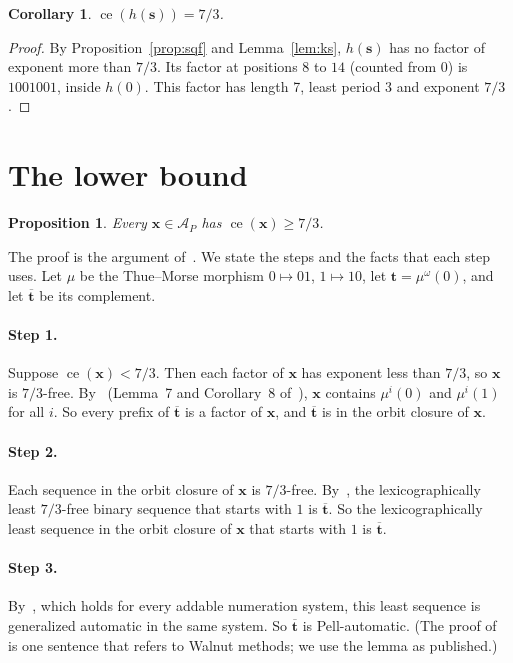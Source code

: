 \documentclass[11pt]{article}
\newtheorem{proposition}[theorem]{Proposition}
\newtheorem{corollary}[theorem]{Corollary}
\theoremstyle{definition}
\theoremstyle{remark}
\DeclareMathOperator{\ce}{ce}
\newcommand{\AP}{\mathcal{A}_P}
\newcommand{\PSQ}{\mathbf{s}}
\newcommand{\tm}{\mathbf{t}}
\begin{document}
\begin{corollary}\label{cor:upper}
$\ce(h(\PSQ)) = 7/3$.
\end{corollary}

\begin{proof}
By Proposition~\ref{prop:sqf} and Lemma~\ref{lem:ks}, $h(\PSQ)$ has no factor of exponent more than $7/3$. Its factor at positions $8$ to $14$ (counted from $0$) is $1001001$, inside $h(0)$. This factor has length 7, least period 3 and exponent $7/3$.
\end{proof}

\section{The lower bound}\label{sec:lower}

\begin{proposition}\label{prop:lower}
Every $\mathbf{x} \in \AP$ has $\ce(\mathbf{x}) \ge 7/3$.
\end{proposition}

The proof is the argument of~\cite[proofs of Theorems~1(b) and~11]{ARS}. We state the steps and the facts that each step uses. Let $\mu$ be the Thue--Morse morphism $0 \mapsto 01$, $1 \mapsto 10$, let $\tm = \mu^\omega(0)$, and let $\overline{\tm}$ be its complement.

\paragraph{Step 1.} Suppose $\ce(\mathbf{x}) < 7/3$. Then each factor of $\mathbf{x}$ has exponent less than $7/3$, so $\mathbf{x}$ is $7/3$-free. By~\cite[Theorem~1]{RSS} (Lemma~7 and Corollary~8 of~\cite{ARS}), $\mathbf{x}$ contains $\mu^i(0)$ and $\mu^i(1)$ for all $i$. So every prefix of $\overline{\tm}$ is a factor of $\mathbf{x}$, and $\overline{\tm}$ is in the orbit closure of $\mathbf{x}$.

\paragraph{Step 2.} Each sequence in the orbit closure of $\mathbf{x}$ is $7/3$-free. By~\cite[Lemma~9]{ARS}, the lexicographically least $7/3$-free binary sequence that starts with $1$ is $\overline{\tm}$. So the lexicographically least sequence in the orbit closure of $\mathbf{x}$ that starts with $1$ is $\overline{\tm}$.

\paragraph{Step 3.} By~\cite[Lemma~10]{ARS}, which holds for every addable numeration system, this least sequence is generalized automatic in the same system. So $\overline{\tm}$ is Pell-automatic. (The proof of~\cite[Lemma~10]{ARS} is one sentence that refers to Walnut methods; we use the lemma as published.)
\end{document}
